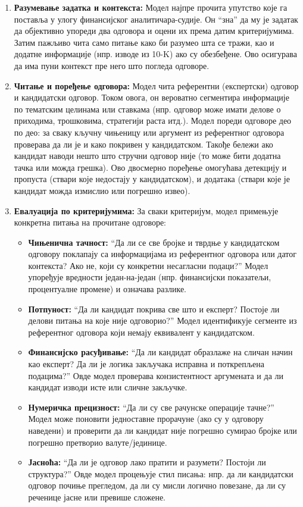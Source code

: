 \begin{enumerate}
    \item \textbf{Разумевање задатка и контекста:} Модел најпре прочита упутство које га поставља у улогу финансијског аналитичара-судије. Он ``зна'' да му је задатак да објективно упореди два одговора и оцени их према датим критеријумима. Затим пажљиво чита само питање како би разумео шта се тражи, као и додатне информације (нпр. изводе из 10-K) ако су обезбеђене. Ово осигурава да има пуни контекст пре него што погледа одговоре.

    \item \textbf{Читање и поређење одговора:} Модел чита референтни (експертски) одговор и кандидатски одговор. Током овога, он вероватно сегментира информације по тематским целинама или ставкама (нпр. одговор може имати делове о приходима, трошковима, стратегији раста итд.). Модел пореди одговоре део по део: за сваку кључну чињеницу или аргумент из референтног одговора проверава да ли је и како покривен у кандидатском. Такође бележи ако кандидат наводи нешто што стручни одговор није (то може бити додатна тачка или можда грешка). Ово двосмерно поређење омогућава детекцију и пропуста (ствари које недостају у кандидатском), и додатака (ствари које је кандидат можда измислио или погрешно извео).

    \item \textbf{Евалуација по критеријумима:} За сваки критеријум, модел примењује конкретна питања на прочитане одговоре:
    \begin{itemize}
        \item \textbf{Чињенична тачност:} ``Да ли се све бројке и тврдње у кандидатском одговору поклапају са информацијама из референтног одговора или датог контекста? Ако не, који су конкретни несагласни подаци?'' Модел упоређује вредности један-на-један (нпр. финансијски показатељи, процентуалне промене) и означава разлике.
        \item \textbf{Потпуност:} ``Да ли кандидат покрива све што и експерт? Постоје ли делови питања на које није одговорио?'' Модел идентификује сегменте из референтног одговора који немају еквивалент у кандидатском.
        \item \textbf{Финансијско расуђивање:} ``Да ли кандидат образлаже на сличан начин као експерт? Да ли је логика закључака исправна и поткрепљена подацима?'' Овде модел проверава конзистентност аргумената и да ли кандидат изводи исте или сличне закључке.
        \item \textbf{Нумеричка прецизност:} ``Да ли су све рачунске операције тачне?'' Модел може поновити једноставне прорачуне (ако су у одговору наведени) и проверити да ли кандидат није погрешно сумирао бројке или погрешно претворио валуте/јединице.
        \item \textbf{Јасноћа:} ``Да ли је одговор лако пратити и разумети? Постоји ли структура?'' Овде модел процењује стил писања: нпр. да ли кандидатски одговор почиње прегледом, да ли су мисли логично повезане, да ли су реченице јасне или превише сложене.
    \end{itemize}


\end{enumerate}
